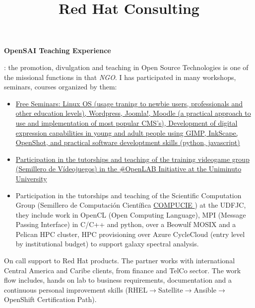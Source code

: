 \documentclass[overlapped,line,final]{res}
\begin{document}
\begin{resume}
\begin{position}
\begin{itemize}
	\end{itemize}
\newpage
\opening
\textbf{OpenSAI Teaching Experience}: the promotion, divulgation and teaching in Open Source Technologies is one of the missional functions in that \textit{NGO}. I has participated in many workshops, seminars, courses organized by them:
\begin{itemize}
	\item \href{https://opensai.org/tags/talleres}{Free Seminars: Linux OS (usage traning to newbie users, professionals and other education levels), Wordpress, Joomla!, Moodle (a practical approach to use and implementation of most popular CMS's), Development of digital expression capabilities in young and adult people using GIMP, InkScape, OpenShot, and practical software developtment skills (python, javascript) {}}
	\item \href{https://opensai.org/tags/videojuegos}{Participation in the tutorships and teaching of the training videogame group (Semillero de Vídeojuegos) in the \#OpenLAB Initiative at the Uniminuto University }
	\item Participation in the tutorships and teaching of the Scientific Computation Group (Semillero de Computación Científica  \href{http://chronos.udistrital.edu.co:8095/siciud/web/Consultas.x?accion=5&idSemillero=2382}{COMPUCIE } ) at the UDFJC, they include work in OpenCL (Open Computing Language), MPI (Message Passing Interface) in C/C++ and python, over a Beowulf MOSIX and a Pelican HPC cluster, HPC provisioning over Azure CycleCloud (entry level by institutional budget) to support galaxy spectral analysis.
	\end{itemize}
\end{position}


\title{\bf Red Hat Consulting}
\begin{position}
	On call support to Red Hat products. The partner works with international Central America and Caribe clients, from finance and TelCo sector. 
The work flow includes, hands on lab to business requirements, documentation and a continuous personal improvement skills (RHEL$\rightarrow$Satellite$\rightarrow$Ansible$\rightarrow$OpenShift Certification Path).
\end{position}


\end{resume}
\end{document}
